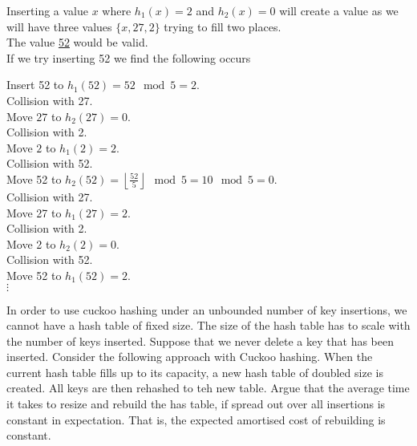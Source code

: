 \documentclass[11pt,a4paper]{article}
\begin{document}
\apart
Inserting a value $x$ where $h_1(x)=2$ and $h_2(x)=0$ will create a value as we will have three values $\{x,27,2\}$ trying to fill two places.\\
The value \underline{52} would be valid.\\
If we try inserting 52 we find the following occurs
\begin{adjustwidth}{1cm}{}
	Insert 52 to $h_1(52)=52\mod5=2$.\\
	Collision with 27.\\
	Move $27$ to $h_2(27)=0$.\\
	Collision with 2.\\
	Move $2$ to $h_1(2)=2$.\\
	Collision with 52.\\
	Move 52 to $h_2(52)=\left\lfloor\frac{52}{5}\right\rfloor\mod5=10\mod5=0$.\\
	Collision with 27.\\
	Move 27 to $h_1(27)=2$.\\
	Collision with 2.\\
	Move 2 to $h_2(2)=0$.\\
	Collision with 52.\\
	Move 52 to $h_1(52)=2$.\\
	$\vdots$
\end{adjustwidth}

\question
In order to use cuckoo hashing under an unbounded number of key insertions, we cannot have a hash table of fixed size. The size of the hash table has to scale with the number of keys inserted. Suppose that we never delete a key that has been inserted. Consider the following approach with Cuckoo hashing. When the current hash table fills up to its capacity, a new hash table of doubled size is created. All keys are then rehashed to teh new table. Argue that the average time it takes to resize and rebuild the has table, if spread out over all insertions is constant in expectation. That is, the expected amortised cost of rebuilding is constant.\\

\ans
\end{document}
